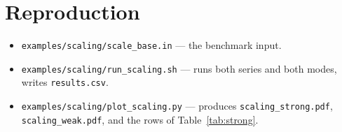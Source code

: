 \documentclass[english,a4paper]{kiseon_memo}
\newcommand{\file}[1]{\texttt{#1}}
\begin{document}
\section{Reproduction}
\begin{itemize}
\item \file{examples/scaling/scale\_base.in} --- the benchmark input.
\item \file{examples/scaling/run\_scaling.sh} --- runs both series and both
      modes, writes \file{results.csv}.
\item \file{examples/scaling/plot\_scaling.py} --- produces
      \file{scaling\_strong.pdf}, \file{scaling\_weak.pdf}, and the rows of
      Table~\ref{tab:strong}.
\end{itemize}
\end{document}
